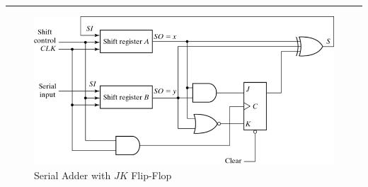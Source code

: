 \noindent\rule{\linewidth}{1pt}

\begin{figure}[H]
  \centering
  \includegraphics[width=\linewidth]{img/serial-adder-with-JK-FF.png}
  \caption*{Serial Adder with $JK$ Flip-Flop}
  \label{fig:serial-adder-with-jk-ff}
\end{figure}
